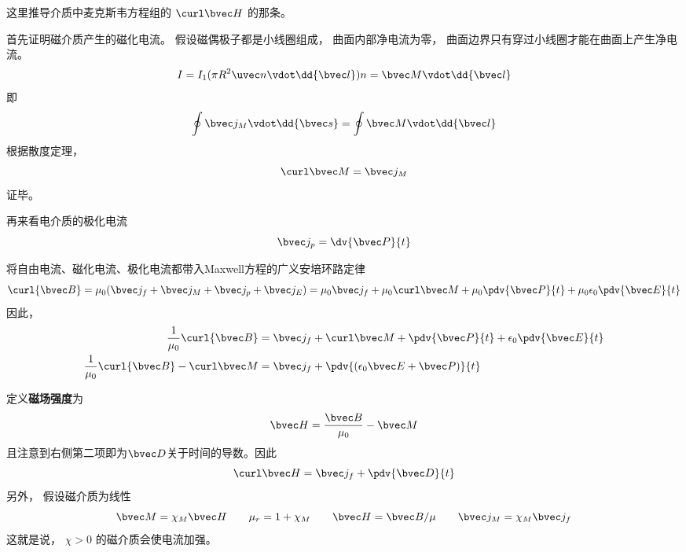 


这里推导介质中麦克斯韦方程组的 $\curl \bvec H$ 的那条。

首先证明磁介质产生的磁化电流。 假设磁偶极子都是小线圈组成， 曲面内部净电流为零， 曲面边界只有穿过小线圈才能在曲面上产生净电流。
\begin{equation}
I = I_1 (\pi R^2 \uvec n \vdot \dd{\bvec l}) n = \bvec M \vdot \dd{\bvec l}
\end{equation}
即
\begin{equation}
\oint \bvec j_M \vdot \dd{\bvec s} = \oint \bvec M \vdot \dd{\bvec l}
\end{equation}
根据散度定理，
\begin{equation}
\curl \bvec M = \bvec j_M
\end{equation}
证毕。

再来看电介质的极化电流
\begin{equation}
\bvec j_p = \dv{\bvec P}{t}
\end{equation}

将自由电流、磁化电流、极化电流都带入Maxwell方程的广义安培环路定律
\begin{equation}
\curl {\bvec B} = \mu_0 (\bvec j_f + \bvec j_M + \bvec j_p + \bvec j_E) = \mu_0 \bvec j_f + \mu_0 \curl \bvec M + \mu_0 \pdv{\bvec P}{t} + \mu_0 \epsilon_0 \pdv{\bvec E}{t}
\end{equation}
因此，
\begin{align}
\frac{1}{\mu_0}\curl {\bvec B} &= \bvec j_f + \curl \bvec M + \pdv{\bvec P}{t} + \epsilon_0 \pdv{\bvec E}{t}\\
\frac{1}{\mu_0}\curl {\bvec B} - \curl \bvec M &= \bvec j_f + \pdv{(\epsilon_0\bvec E+\bvec P)}{t}\\
\end{align}

定义\textbf{磁场强度}为
\begin{equation}
\bvec H = \frac{\bvec B}{\mu_0} - \bvec M
\end{equation}
且注意到右侧第二项即为$\bvec D$关于时间的导数。因此
\begin{equation}
\curl \bvec H = \bvec j_f + \pdv{\bvec D}{t}
\end{equation}
另外， 假设磁介质为线性
\begin{equation}
\bvec M = \chi_M \bvec H
\qquad
\mu_r = 1 + \chi_M
\qquad
\bvec H = \bvec B/\mu
\qquad
\bvec j_M = \chi_M \bvec j_f
\end{equation}
这就是说， $\chi > 0$ 的磁介质会使电流加强。
